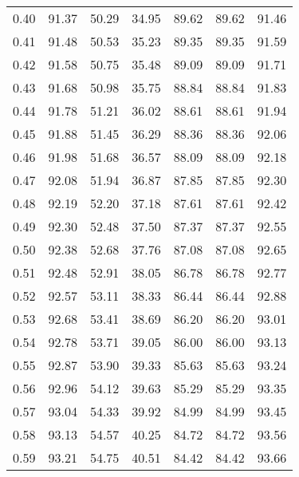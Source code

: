 \begin{tabular}{|c|c|c|c|c|c|c|}
      0.40 &     91.37 &     50.29 &      34.95 &   89.62 &      89.62 &         91.46 \\
      0.41 &     91.48 &     50.53 &      35.23 &   89.35 &      89.35 &         91.59 \\
      0.42 &     91.58 &     50.75 &      35.48 &   89.09 &      89.09 &         91.71 \\
      0.43 &     91.68 &     50.98 &      35.75 &   88.84 &      88.84 &         91.83 \\
      0.44 &     91.78 &     51.21 &      36.02 &   88.61 &      88.61 &         91.94 \\
      0.45 &     91.88 &     51.45 &      36.29 &   88.36 &      88.36 &         92.06 \\
      0.46 &     91.98 &     51.68 &      36.57 &   88.09 &      88.09 &         92.18 \\
      0.47 &     92.08 &     51.94 &      36.87 &   87.85 &      87.85 &         92.30 \\
      0.48 &     92.19 &     52.20 &      37.18 &   87.61 &      87.61 &         92.42 \\
      0.49 &     92.30 &     52.48 &      37.50 &   87.37 &      87.37 &         92.55 \\
      0.50 &     92.38 &     52.68 &      37.76 &   87.08 &      87.08 &         92.65 \\
      0.51 &     92.48 &     52.91 &      38.05 &   86.78 &      86.78 &         92.77 \\
      0.52 &     92.57 &     53.11 &      38.33 &   86.44 &      86.44 &         92.88 \\
      0.53 &     92.68 &     53.41 &      38.69 &   86.20 &      86.20 &         93.01 \\
      0.54 &     92.78 &     53.71 &      39.05 &   86.00 &      86.00 &         93.13 \\
      0.55 &     92.87 &     53.90 &      39.33 &   85.63 &      85.63 &         93.24 \\
      0.56 &     92.96 &     54.12 &      39.63 &   85.29 &      85.29 &         93.35 \\
      0.57 &     93.04 &     54.33 &      39.92 &   84.99 &      84.99 &         93.45 \\
      0.58 &     93.13 &     54.57 &      40.25 &   84.72 &      84.72 &         93.56 \\
      0.59 &     93.21 &     54.75 &      40.51 &   84.42 &      84.42 &         93.66 \\

\end{tabular}
